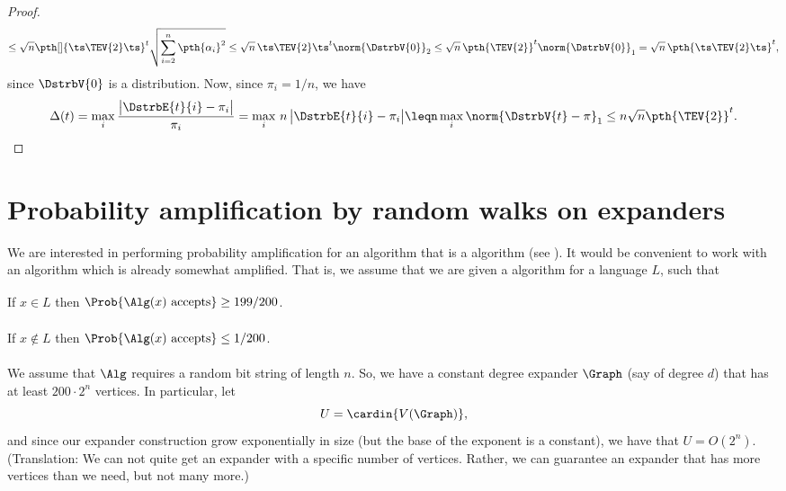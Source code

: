 \begin{proof}
\begin{align*}
      \leq%
      \sqrt{n} \pth[]{\ts\smash{\TEV{2}}\ts}^t \sqrt{\sum_{i=2}^n \pth{
      \alpha_i}^2} \leq%
      \sqrt{n}\, {\ts\TEV{2}\ts}^t \norm{\DstrbV{0}}_2%
      \leq%
      \sqrt{n}\, \pth{\bigl.\smash{\TEV{2}}}^t
      \norm{\bigl.\smash{\DstrbV{0}}}_1%
      =%
      \sqrt{n}\, \pth{\ts\bigl.\smash{\TEV{2}}\ts}^t,
    \end{align*}
    since $\DstrbV{0}$ is a distribution. Now, since $\pi_i = 1/n$, we
    have
    \begin{equation*}
        \Delta(t)%
        =%
        \max_i \frac{\bigl| {\DstrbE{t}{i} -\pi_i} \bigr| }{\pi_i}%
        =%
        \max_i \,n \,{\bigl|{\DstrbE{t}{i} - \pi_i}\bigr|}%
        \leq%
        n \max_i \norm{\smash{\DstrbV{t}} - \pi}_1 \leq n
        \sqrt{n} \pth{\bigl.\smash{\TEV{2}}}^t.
    \end{equation*}
\end{proof}


\section{Probability amplification by random walks %
   on expanders}

We are interested in performing probability amplification for an
algorithm that is a  algorithm (see ).
It would be convenient to work with an algorithm which is already
somewhat amplified. That is, we assume that we are given a
 algorithm \Alg for a language $L$, such that 

\smallskip

\begin{compactenumA}
    \item If $x \in L$ then $\Big.\Prob{\bigl. \Alg(x) \text{
          accepts}} \geq 199/200$.
    
    \smallskip

    \item If $x \notin L$ then
    $\Big. \Prob{\bigl.\Alg(x) \text{ accepts}} \leq 1/200$.
\end{compactenumA}

\medskip

We assume that $\Alg$ requires a random bit string of length $n$. So,
we have a constant degree expander $\Graph$ (say of degree $d$) that
has at least $200 \cdot 2^n$ vertices. In particular, let 
\begin{equation*}
    U = \cardin{V(\Graph)},
\end{equation*}
and since our expander construction grow exponentially in size (but
the base of the exponent is a constant), we have that $U =
O(2^n)$. (Translation: We can not quite get an expander with a
specific number of vertices. Rather, we can guarantee an expander that
has more vertices than we need, but not many more.)

